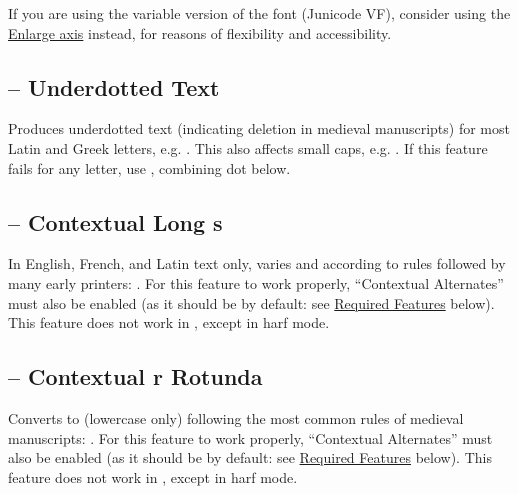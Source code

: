 \noindent If you are using the variable version of the font (Junicode VF), consider using the
\hyperlink{enlarge}{Enlarge axis}
instead, for reasons of flexibility and accessibility.

\subsection{ – Underdotted Text}
Produces underdotted text (indicating deletion in medieval manuscripts) for most
Latin and Greek letters, e.g.
. This also affects small
caps, e.g. .
If this feature fails for any letter, use , combining dot below.

\subsection{ – Contextual Long s}
In English, French, and Latin text only, varies  and  according to rules
followed by many early printers: . For this
feature to work properly,  “Contextual Alternates” must also be enabled (as it should be by
default: see \hyperlink{req}{Required Features} below). This feature does not work in {\ltech}, except in harf mode.

\subsection{ –
Contextual r Rotunda}\hypertarget{ss16}{}
Converts  to  (lowercase only) following the
most common rules of medieval manuscripts:
.
For this feature to work properly,
 “Contextual Alternates” must also be enabled (as it should be by default: see
\hyperlink{req}{Required Features} below).  This feature does not work in {\ltech}, except in harf mode.

